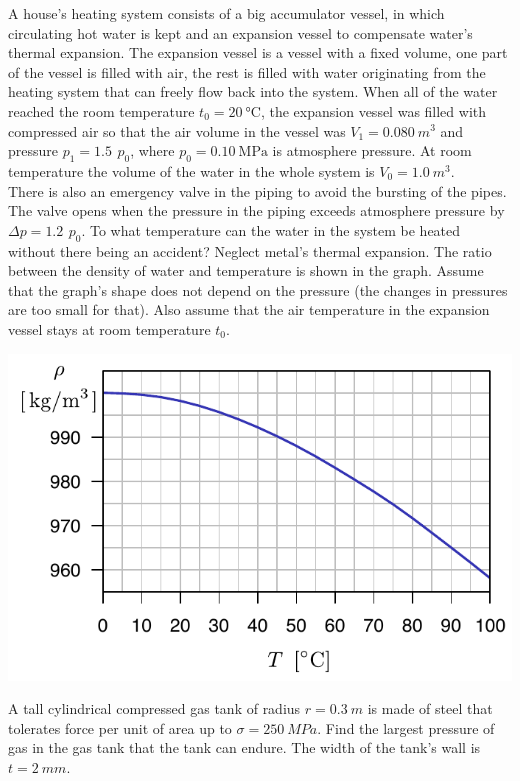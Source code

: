 \documentclass[11pt]{article}
\begin{document}
\probeng
A house’s heating system consists of a big accumulator vessel, in which circulating hot water is kept and an expansion vessel to compensate water’s thermal expansion. The expansion vessel is a vessel with a fixed volume, one part of the vessel is filled with air, the rest is filled with water originating from the heating system that can freely flow back into the system. When all of the water reached the room temperature $t_0=\SI{20}{\degreeCelsius}$, the expansion vessel was filled with compressed air so that the air volume in the vessel was $V_1=\SI{0.080}{m^3}$ and pressure $p_1=\SI{1.5}{}\,p_0$, where $p_0=\SI{0.10}{\mega\pascal}$ is atmosphere pressure. At room temperature the volume of the water in the whole system is $V_0=\SI{1.0}{m^3}$.\\
There is also an emergency valve in the piping to avoid the bursting of the pipes. The valve opens when the pressure in the piping exceeds atmosphere pressure by $\Delta p = \SI{1.2}{} \, p_0 $. To what temperature can the water in the system be heated without there being an accident? Neglect metal’s thermal expansion. The ratio between the density of water and temperature is shown in the graph. Assume that the graph’s shape does not depend on the pressure (the changes in pressures are too small for that). Also assume that the air temperature in the expansion vessel stays at room temperature $t_0$.
\begin{center}
\includegraphics[width=0.8\linewidth]{2014-v3g-03-veeTihedus}
\end{center}
\probend
\bigskip


\probeng
A tall cylindrical compressed gas tank of radius $r=\SI{0,3}{m}$ is made of steel that tolerates force per unit of area up to $\sigma=\SI{250}{MPa}$. Find the largest pressure of gas in the gas tank that the tank can endure. The width of the tank’s wall is $t=\SI{2}{mm}$.
\probend
\bigskip
\end{document}
